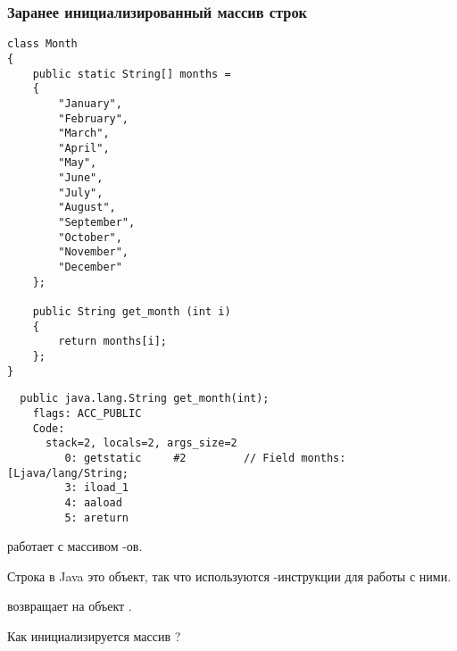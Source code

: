 \subsubsection{Заранее инициализированный массив строк}
\label{Java_2D_array_month}

\begin{lstlisting}
class Month
{
	public static String[] months = 
	{
		"January", 
		"February", 
		"March", 
		"April",
		"May",
		"June",
		"July",
		"August",
		"September",
		"October",
		"November",
		"December"
	};

	public String get_month (int i)
	{
		return months[i];
	};
} 
\end{lstlisting}




\begin{lstlisting}
  public java.lang.String get_month(int);
    flags: ACC_PUBLIC
    Code:
      stack=2, locals=2, args_size=2
         0: getstatic     #2         // Field months:[Ljava/lang/String;
         3: iload_1       
         4: aaload        
         5: areturn       
\end{lstlisting}


 работает с массивом -ов.

Строка в Java это объект, так что используются -инструкции для работы с ними.

 возвращает  на объект .


Как инициализируется массив ?


